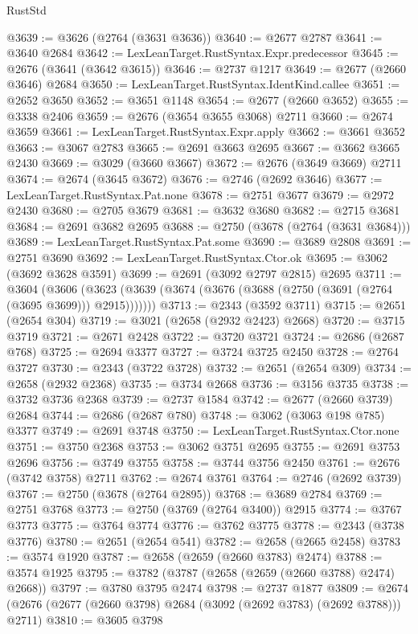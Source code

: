 \begin{lexlean}{RustStd}
\begin{coremodule}
@3639 := @3626 (@2764 (@3631 @3636))
@3640 := @2677 @2787
@3641 := @3640 @2684
@3642 := LexLeanTarget.RustSyntax.Expr.predecessor
@3645 := @2676 (@3641 (@3642 @3615))
@3646 := @2737 @1217
@3649 := @2677 (@2660 @3646) @2684
@3650 := LexLeanTarget.RustSyntax.IdentKind.callee
@3651 := @2652 @3650
@3652 := @3651 @1148
@3654 := @2677 (@2660 @3652)
@3655 := @3338 @2406
@3659 := @2676 (@3654 @3655 @3068) @2711
@3660 := @2674 @3659
@3661 := LexLeanTarget.RustSyntax.Expr.apply
@3662 := @3661 @3652
@3663 := @3067 @2783
@3665 := @2691 @3663 @2695
@3667 := @3662 @3665 @2430
@3669 := @3029 (@3660 @3667)
@3672 := @2676 (@3649 @3669) @2711
@3674 := @2674 (@3645 @3672)
@3676 := @2746 (@2692 @3646)
@3677 := LexLeanTarget.RustSyntax.Pat.none
@3678 := @2751 @3677
@3679 := @2972 @2430
@3680 := @2705 @3679
@3681 := @3632 @3680
@3682 := @2715 @3681
@3684 := @2691 @3682 @2695
@3688 := @2750 (@3678 (@2764 (@3631 @3684)))
@3689 := LexLeanTarget.RustSyntax.Pat.some
@3690 := @3689 @2808
@3691 := @2751 @3690
@3692 := LexLeanTarget.RustSyntax.Ctor.ok
@3695 := @3062 (@3692 @3628 @3591)
@3699 := @2691 (@3092 @2797 @2815) @2695
@3711 := @3604
    (@3606 (@3623 (@3639 (@3674 (@3676 (@3688 (@2750 (@3691 (@2764 (@3695 @3699))) @2915)))))))
@3713 := @2343 (@3592 @3711)
@3715 := @2651 (@2654 @304)
@3719 := @3021 (@2658 (@2932 @2423) @2668)
@3720 := @3715 @3719
@3721 := @2671 @2428
@3722 := @3720 @3721
@3724 := @2686 (@2687 @768)
@3725 := @2694 @3377
@3727 := @3724 @3725 @2450
@3728 := @2764 @3727
@3730 := @2343 (@3722 @3728)
@3732 := @2651 (@2654 @309)
@3734 := @2658 (@2932 @2368)
@3735 := @3734 @2668
@3736 := @3156 @3735
@3738 := @3732 @3736 @2368
@3739 := @2737 @1584
@3742 := @2677 (@2660 @3739) @2684
@3744 := @2686 (@2687 @780)
@3748 := @3062 (@3063 @198 @785) @3377
@3749 := @2691 @3748
@3750 := LexLeanTarget.RustSyntax.Ctor.none
@3751 := @3750 @2368
@3753 := @3062 @3751 @2695
@3755 := @2691 @3753 @2696
@3756 := @3749 @3755
@3758 := @3744 @3756 @2450
@3761 := @2676 (@3742 @3758) @2711
@3762 := @2674 @3761
@3764 := @2746 (@2692 @3739)
@3767 := @2750 (@3678 (@2764 @2895))
@3768 := @3689 @2784
@3769 := @2751 @3768
@3773 := @2750 (@3769 (@2764 @3400)) @2915
@3774 := @3767 @3773
@3775 := @3764 @3774
@3776 := @3762 @3775
@3778 := @2343 (@3738 @3776)
@3780 := @2651 (@2654 @541)
@3782 := @2658 (@2665 @2458)
@3783 := @3574 @1920
@3787 := @2658 (@2659 (@2660 @3783) @2474)
@3788 := @3574 @1925
@3795 := @3782 (@3787 (@2658 (@2659 (@2660 @3788) @2474) @2668))
@3797 := @3780 @3795 @2474
@3798 := @2737 @1877
@3809 := @2674 (@2676 (@2677 (@2660 @3798) @2684 (@3092 (@2692 @3783) (@2692 @3788))) @2711)
@3810 := @3605 @3798

\end{coremodule}
\end{lexlean}
